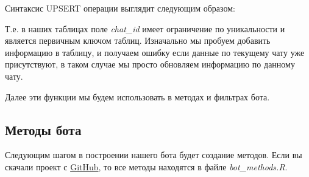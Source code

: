 \documentclass[
]{book}
\newenvironment{Shaded}{\begin{snugshade}}{\end{snugshade}}
\newcommand{\KeywordTok}[1]{\textcolor[rgb]{0.13,0.29,0.53}{\textbf{#1}}}
\newcommand{\NormalTok}[1]{#1}
\newcommand{\OperatorTok}[1]{\textcolor[rgb]{0.81,0.36,0.00}{\textbf{#1}}}
\newcommand{\StringTok}[1]{\textcolor[rgb]{0.31,0.60,0.02}{#1}}
\begin{document}
Синтаксис UPSERT операции выглядит следующим образом:

\begin{Shaded}
\end{Shaded}

Т.е. в наших таблицах поле \emph{chat\_id} имеет ограничение по уникальности и является первичным ключом таблиц. Изначально мы пробуем добавить информацию в таблицу, и получаем ошибку если данные по текущему чату уже присутствуют, в таком случае мы просто обновляем информацию по данному чату.

Далее эти функции мы будем использовать в методах и фильтрах бота.

\subsection{Методы бота}\label{ux43cux435ux442ux43eux434ux44b-ux431ux43eux442ux430-1}

Следующим шагом в построении нашего бота будет создание методов. Если вы скачали проект с \href{https://github.com/selesnow/logical_tg_bot/archive/master.zip}{GitHub}, то все методы находятся в файле \emph{bot\_methods.R}.
\end{document}
